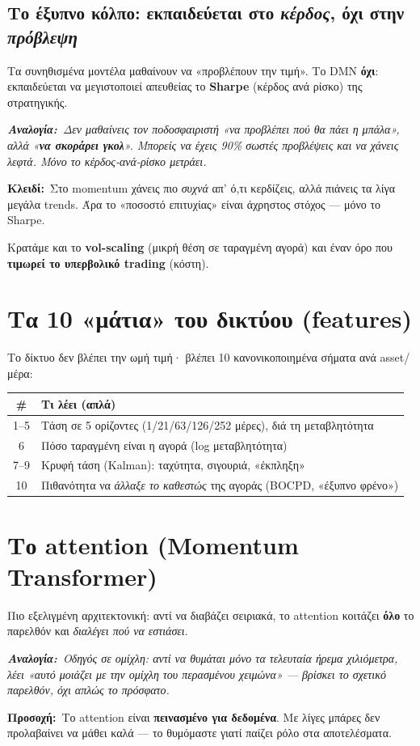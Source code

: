 \documentclass[11pt]{article}
\newcommand{\key}[1]{\par\medskip\noindent\colorbox{soft}{\parbox{\dimexpr\linewidth-2\fboxsep}{\textcolor{accent}{\textbf{Κλειδί:}}\ #1}}\par\medskip}
\newcommand{\analogy}[1]{\par\smallskip\noindent\textit{\textbf{Αναλογία:}\ #1}\par\smallskip}
\newcommand{\warnb}[1]{\par\medskip\noindent\colorbox{soft}{\parbox{\dimexpr\linewidth-2\fboxsep}{\textcolor{warn}{\textbf{Προσοχή:}}\ #1}}\par\medskip}
\begin{document}
\subsection{Το έξυπνο κόλπο: εκπαιδεύεται στο \emph{κέρδος}, όχι στην \emph{πρόβλεψη}}
Τα συνηθισμένα μοντέλα μαθαίνουν να «προβλέπουν την τιμή». Το DMN \textbf{όχι}: εκπαιδεύεται να
μεγιστοποιεί απευθείας το \textbf{Sharpe} (κέρδος ανά ρίσκο) της στρατηγικής.
\analogy{Δεν μαθαίνεις τον ποδοσφαιριστή «να προβλέπει πού θα πάει η μπάλα», αλλά «\textbf{να σκοράρει
γκολ}». Μπορείς να έχεις 90\% σωστές προβλέψεις και να χάνεις λεφτά. Μόνο το κέρδος-ανά-ρίσκο μετράει.}
\key{Στο momentum χάνεις πιο \emph{συχνά} απ' ό,τι κερδίζεις, αλλά πιάνεις τα λίγα μεγάλα trends. Άρα
το «ποσοστό επιτυχίας» είναι άχρηστος στόχος --- μόνο το Sharpe.} Κρατάμε και το \textbf{vol-scaling}
(μικρή θέση σε ταραγμένη αγορά) και έναν όρο που \textbf{τιμωρεί το υπερβολικό trading} (κόστη).

\section{Τα 10 «μάτια» του δικτύου (features)}
Το δίκτυο δεν βλέπει την ωμή τιμή· βλέπει 10 κανονικοποιημένα σήματα ανά asset/μέρα:
\begin{center}\small
\begin{tabular}{cl}
\toprule
\# & Τι λέει (απλά) \\
\midrule
1--5 & Τάση σε 5 ορίζοντες (1/21/63/126/252 μέρες), διά τη μεταβλητότητα \\
6 & Πόσο ταραγμένη είναι η αγορά (log μεταβλητότητα) \\
7--9 & Κρυφή τάση (Kalman): ταχύτητα, σιγουριά, «έκπληξη» \\
10 & Πιθανότητα να \emph{άλλαξε το καθεστώς} της αγοράς (BOCPD, «έξυπνο φρένο») \\
\bottomrule
\end{tabular}
\end{center}

\section{Το attention (Momentum Transformer)}
Πιο εξελιγμένη αρχιτεκτονική: αντί να διαβάζει σειριακά, το attention κοιτάζει \textbf{όλο} το παρελθόν
και \emph{διαλέγει πού να εστιάσει}.
\analogy{Οδηγός σε ομίχλη: αντί να θυμάται μόνο τα τελευταία ήρεμα χιλιόμετρα, λέει «αυτό μοιάζει με την
ομίχλη του περασμένου χειμώνα» --- βρίσκει το \emph{σχετικό} παρελθόν, όχι απλώς το πρόσφατο.}
\warnb{Το attention είναι \textbf{πεινασμένο για δεδομένα}. Με λίγες μπάρες δεν προλαβαίνει να μάθει
καλά --- το θυμόμαστε γιατί παίζει ρόλο στα αποτελέσματα.}
\end{document}

